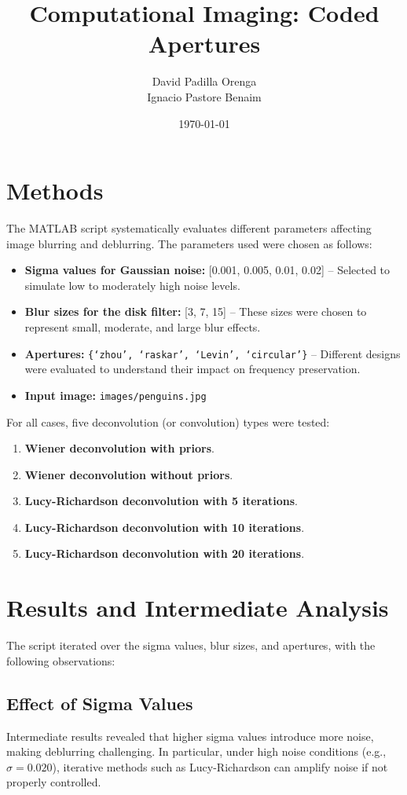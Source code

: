 \documentclass[a4paper,10pt]{article}
\title{Computational Imaging: Coded Apertures}
\author{David Padilla Orenga \\ Ignacio Pastore Benaim}
\date{\today}
\begin{document}
\maketitle
\thispagestyle{empty}

\section{Methods}
The MATLAB script systematically evaluates different parameters affecting image blurring and deblurring. The parameters used were chosen as follows:
\begin{itemize}
    \item \textbf{Sigma values for Gaussian noise:} [0.001, 0.005, 0.01, 0.02] -- Selected to simulate low to moderately high noise levels.
    \item \textbf{Blur sizes for the disk filter:} [3, 7, 15] -- These sizes were chosen to represent small, moderate, and large blur effects.
    \item \textbf{Apertures:} \texttt{\{`zhou', `raskar', `Levin', `circular'\}} -- Different designs were
     evaluated to understand their impact on frequency preservation.
    \item \textbf{Input image:} \texttt{images/penguins.jpg}
\end{itemize}

For all cases, five deconvolution (or convolution) types were tested:
\begin{enumerate}
    \item \textbf{Wiener deconvolution with priors}.
    \item \textbf{Wiener deconvolution without priors}.
    \item \textbf{Lucy-Richardson deconvolution with 5 iterations}.
    \item \textbf{Lucy-Richardson deconvolution with 10 iterations}.
    \item \textbf{Lucy-Richardson deconvolution with 20 iterations}.
\end{enumerate}


\section{Results and Intermediate Analysis}
The script iterated over the sigma values, blur sizes, and apertures, with the following observations:

\subsection{Effect of Sigma Values}
Intermediate results revealed that higher sigma values introduce more noise, making deblurring challenging.
 In particular, under high noise conditions (e.g., $\sigma=0.020$), iterative methods such as Lucy-Richardson 
 can amplify noise if not properly controlled.
\end{document}
